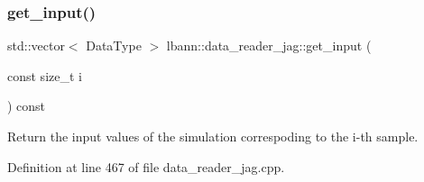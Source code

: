 \subsubsection{\texorpdfstring{get\+\_\+input()}{get\_input()}}
{\footnotesize\ttfamily std\+::vector$<$ Data\+Type $>$ lbann\+::data\+\_\+reader\+\_\+jag\+::get\+\_\+input (\begin{DoxyParamCaption}\item[{const size\+\_\+t}]{i }\end{DoxyParamCaption}) const}



Return the input values of the simulation correspoding to the i-\/th sample. 



Definition at line 467 of file data\+\_\+reader\+\_\+jag.\+cpp.


